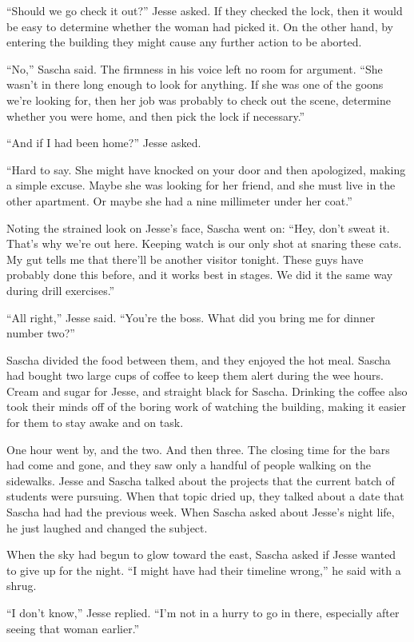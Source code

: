 \documentclass[12pt]{book}
\begin{document}
``Should we go check it out?'' Jesse asked.  If they checked the lock, then it would be easy to determine whether the woman had picked it.  On the other hand, by entering the building they might cause any further action to be aborted.

``No,'' Sascha said.  The firmness in his voice left no room for argument.  ``She wasn't in there long enough to look for anything.  If she was one of the goons we're looking for, then her job was probably to check out the scene, determine whether you were home, and then pick the lock if necessary.''

``And if I had been home?'' Jesse asked.

``Hard to say.  She might have knocked on your door and then apologized, making a simple excuse.  Maybe she was looking for her friend, and she must live in the other apartment.  Or maybe she had a nine millimeter under her coat.''

Noting the strained look on Jesse's face, Sascha went on: ``Hey, don't sweat it.  That's why we're out here.  Keeping watch is our only shot at snaring these cats.  My gut tells me that there'll be another visitor tonight.  These guys have probably done this before, and it works best in stages.  We did it the same way during drill exercises.''

``All right,'' Jesse said.  ``You're the boss.  What did you bring me for dinner number two?''

Sascha divided the food between them, and they enjoyed the hot meal.  Sascha had bought two large cups of coffee to keep them alert during the wee hours.  Cream and sugar for Jesse, and straight black for Sascha.  Drinking the coffee also took their minds off of the boring work of watching the building, making it easier for them to stay awake and on task.

One hour went by, and the two.  And then three.  The closing time for the bars had come and gone, and they saw only a handful of people walking on the sidewalks.  Jesse and Sascha talked about the projects that the current batch of students were pursuing.  When that topic dried up, they talked about a date that Sascha had had the previous week.  When Sascha asked about Jesse's night life, he just laughed and changed the subject.

When the sky had begun to glow toward the east, Sascha asked if Jesse wanted to give up for the night.  ``I might have had their timeline wrong,'' he said with a shrug.

``I don't know,'' Jesse replied.  ``I'm not in a hurry to go in there, especially after seeing that woman earlier.''
\end{document}
